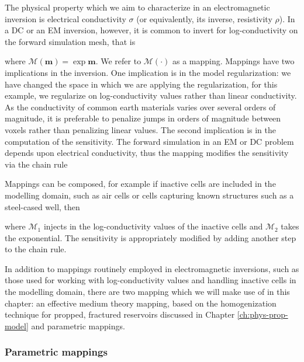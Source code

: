 The physical property which we aim to characterize in an electromagnetic inversion is electrical conductivity $\sigma$ (or equivalently, its inverse, resistivity $\rho$). In a DC or an EM inversion, however, it is common to invert for log-conductivity on the forward simulation mesh, that is

where $\mathcal{M}(\mathbf{m}) = \exp{\mathbf{m}}$. We refer to $\mathcal{M}(\cdot)$ as a mapping. Mappings have two implications in the inversion. One implication is in the model regularization: we have changed the space in which we are applying the regularization, for this example, we regularize on log-conductivity values rather than linear conductivity. As the conductivity of common earth materials varies over several orders of magnitude, it is preferable to penalize jumps in orders of magnitude between voxels rather than penalizing linear values. The second implication is in the computation of the sensitivity. The forward simulation in an EM or DC problem depends upon electrical conductivity, thus the mapping modifies the sensitivity via the chain rule


Mappings can be composed, for example if inactive cells are included in the modelling domain, such as air cells or cells capturing known structures such as a steel-cased well, then

where $\mathcal{M}_1$ injects in the log-conductivity values of the inactive cells and $\mathcal{M}_2$ takes the exponential. The sensitivity is appropriately modified by adding another step to the chain rule.

In addition to mappings routinely employed in electromagnetic inversions, such as those used for working with log-conductivity values and handling inactive cells in the modelling domain, there are two mapping which we will make use of in this chapter: an effective medium theory mapping, based on the homogenization technique for propped, fractured reservoirs discussed in Chapter \ref{ch:phys-prop-model} and parametric mappings.

\subsubsection{Parametric mappings}

